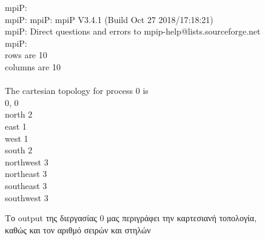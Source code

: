 \begin{figure}[h]
\begin{tcolorbox}
mpiP: \\
mpiP: mpiP: mpiP V3.4.1 (Build Oct 27 2018/17:18:21) \\
mpiP: Direct questions and errors to mpip-help@lists.sourceforge.net \\
mpiP:  \\
rows are 10 \\
columns are 10 \\
\\
The cartesian topology for process 0 is \\
0, 0 \\
north 2 \\
east 1 \\
west 1 \\
south 2 \\
northwest 3 \\
northeast 3 \\
southeast 3 \\
southwest 3 \\
\end{tcolorbox}
\caption{Το output της διεργασίας $0$ μας περιγράφει την καρτεσιανή τοπολογία, καθώς και τον αριθμό σειρών και στηλών}
\label{fig:verification}
\end{figure}


